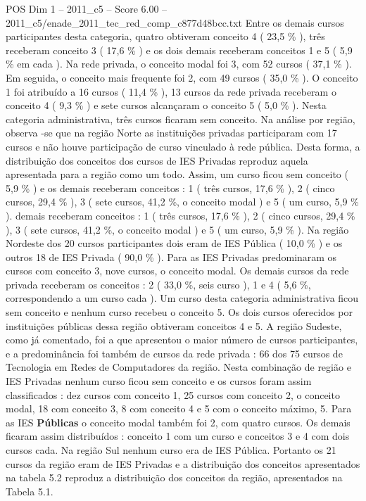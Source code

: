 \begin{textsample}{POS Dim 1 – 2011\_c5 – Score 6.00 – 2011\_c5/enade\_2011\_tec\_red\_comp\_c877d48bcc.txt}
Entre os demais cursos participantes desta categoria, quatro obtiveram conceito 4 ( 23,5 \% ), três receberam conceito 3 ( 17,6 \% ) e os dois demais receberam conceitos 1 e 5 ( 5,9 \% em cada ).
Na rede privada, o conceito modal foi 3, com 52 cursos ( 37,1 \% ).
Em seguida, o conceito mais frequente foi 2, com 49 cursos ( 35,0 \% ).
O conceito 1 foi atribuído a 16 cursos ( 11,4 \% ), 13 cursos da rede privada receberam o conceito 4 ( 9,3 \% ) e sete cursos alcançaram o conceito 5 ( 5,0 \% ).
Nesta categoria administrativa, três cursos ficaram sem conceito.
Na análise por região, observa -se que na região Norte as instituições privadas participaram com 17 cursos e não houve participação de curso vinculado à rede pública.
Desta forma, a distribuição dos conceitos dos cursos de IES Privadas reproduz aquela apresentada para a região como um todo.
Assim, um curso ficou sem conceito ( 5,9 \% ) e os demais receberam conceitos : 1 ( três cursos, 17,6 \% ), 2 ( cinco cursos, 29,4 \% ), 3 ( sete cursos, 41,2 \%, o conceito modal ) e 5 ( um curso, 5,9 \% ). demais receberam conceitos : 1 ( três cursos, 17,6 \% ), 2 ( cinco cursos, 29,4 \% ), 3 ( sete cursos, 41,2 \%, o conceito modal ) e 5 ( um curso, 5,9 \% ).
Na região Nordeste dos 20 cursos participantes dois eram de IES Pública ( 10,0 \% ) e os outros 18 de IES Privada ( 90,0 \% ).
Para as IES Privadas predominaram os cursos com conceito 3, nove cursos, o conceito modal.
Os demais cursos da rede privada receberam os conceitos : 2 ( 33,0 \%, seis curso ), 1 e 4 ( 5,6 \%, correspondendo a um curso cada ).
Um curso desta categoria administrativa ficou sem conceito e nenhum curso recebeu o conceito 5.
Os dois cursos oferecidos por instituições públicas dessa região obtiveram conceitos 4 e 5.
A região Sudeste, como já comentado, foi a que apresentou o maior número de cursos participantes, e a predominância foi também de cursos da rede privada : 66 dos 75 cursos de Tecnologia em Redes de Computadores da região.
Nesta combinação de região e IES Privadas nenhum curso ficou sem conceito e os cursos foram assim classificados : dez cursos com conceito 1, 25 cursos com conceito 2, o conceito modal, 18 com conceito 3, 8 com conceito 4 e 5 com o conceito máximo, 5.
Para as IES \textbf{Públicas} o conceito modal também foi 2, com quatro cursos.
Os demais ficaram assim distribuídos : conceito 1 com um curso e conceitos 3 e 4 com dois cursos cada.
Na região Sul nenhum curso era de IES Pública.
Portanto os 21 cursos da região eram de IES Privadas e a distribuição dos conceitos apresentados na tabela 5.2 reproduz a distribuição dos conceitos da região, apresentados na Tabela 5.1.

\end{textsample}
